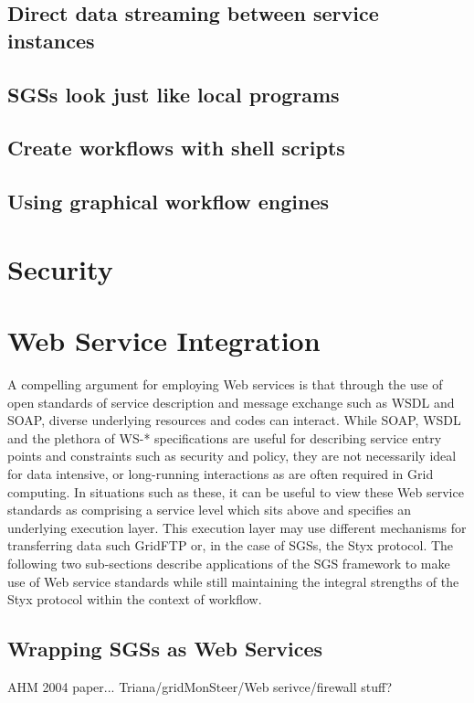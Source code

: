 \documentclass{llncs}
\begin{document}
\subsection{Direct data streaming between service instances}

\subsection{SGSs look just like local programs}

\subsection{Create workflows with shell scripts}
%
\subsection{Using graphical workflow engines}
%
\section{Security}
%

\section{Web Service Integration}
\label{sec:webservices}

A compelling argument for employing Web services is that through the use of open standards of service description and message exchange such as WSDL and SOAP, diverse underlying resources and codes can interact. While SOAP, WSDL and the plethora of WS-* specifications are useful for describing service entry points and constraints such as security and policy, they are not necessarily ideal for data intensive, or long-running interactions as are often required in Grid computing. In situations such as these, it can be useful to view these Web service standards as comprising a service level which sits above and specifies an underlying execution layer. This execution layer may use different mechanisms for transferring data such GridFTP or, in the case of SGSs, the Styx protocol. The following two sub-sections describe applications of the SGS framework to make use of Web service standards while still maintaining the integral strengths of the Styx protocol within the context of workflow.

\subsection{Wrapping SGSs as Web Services}
AHM 2004 paper...
Triana/gridMonSteer/Web serivce/firewall stuff?
\end{document}

